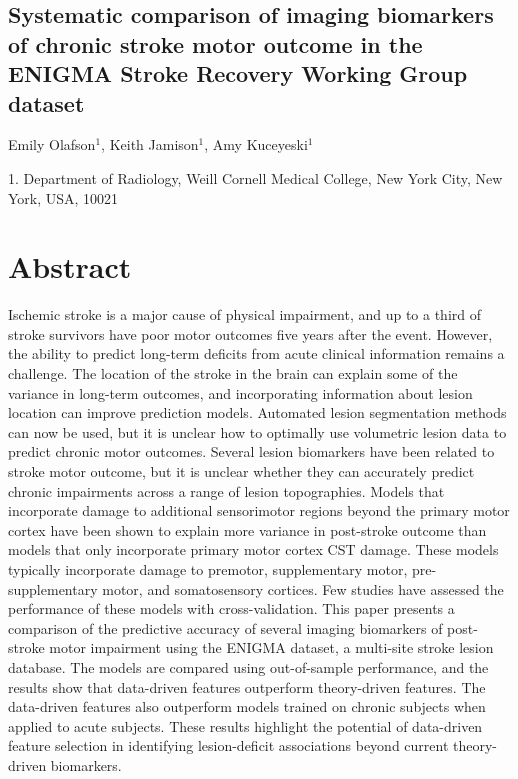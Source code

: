 \documentclass[10pt]{article}
\begin{document}
 

\begin{center}
{\large \section*{Systematic comparison of imaging biomarkers of chronic stroke motor outcome in the ENIGMA Stroke Recovery Working Group dataset}}
\end{center}

\begin{center}
Emily Olafson$^1$, Keith Jamison$^1$, Amy Kuceyeski$^1$
\end{center}

    1. \textmd{Department of Radiology, Weill Cornell Medical College, New York City, New York, USA, 10021} 



\section{Abstract}
Ischemic stroke is a major cause of physical impairment, and up to a third of stroke survivors have poor motor outcomes five years after the event. However, the ability to predict long-term deficits from acute clinical information remains a challenge. The location of the stroke in the brain can explain some of the variance in long-term outcomes, and incorporating information about lesion location can improve prediction models. Automated lesion segmentation methods can now be used, but it is unclear how to optimally use volumetric lesion data to predict chronic motor outcomes. Several lesion biomarkers have been related to stroke motor outcome, but it is unclear whether they can accurately predict chronic impairments across a range of lesion topographies. Models that incorporate damage to additional sensorimotor regions beyond the primary motor cortex have been shown to explain more variance in post-stroke outcome than models that only incorporate primary motor cortex CST damage. These models typically incorporate damage to premotor, supplementary motor, pre-supplementary motor, and somatosensory cortices. Few studies have assessed the performance of these models with cross-validation. This paper presents a comparison of the predictive accuracy of several imaging biomarkers of post-stroke motor impairment using the ENIGMA dataset, a multi-site stroke lesion database. The models are compared using out-of-sample performance, and the results show that data-driven features outperform theory-driven features. The data-driven features also outperform models trained on chronic subjects when applied to acute subjects. These results highlight the potential of data-driven feature selection in identifying lesion-deficit associations beyond current theory-driven biomarkers.
\end{document}
